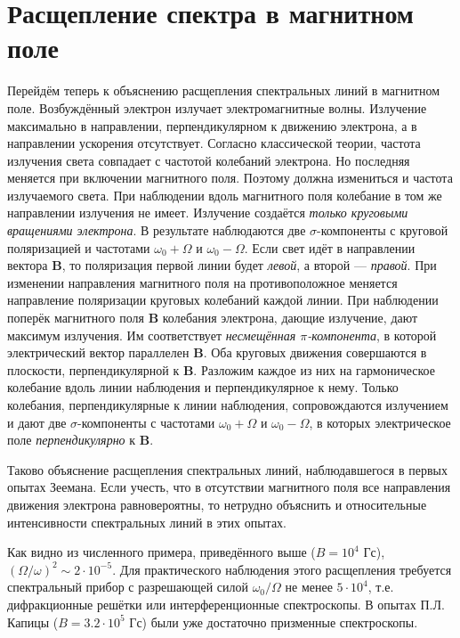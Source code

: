 \documentclass[12pt]{article}
\begin{document}
  \section{Расщепление спектра в магнитном поле}
  Перейдём теперь к объяснению расщепления спектральных линий в магнитном поле. Возбуждённый электрон излучает электромагнитные волны. Излучение максимально в направлении, перпендикулярном к движению электрона, а в направлении ускорения отсутствует. Согласно классической теории, частота излучения света совпадает с частотой колебаний электрона. Но последняя меняется при включении магнитного поля. Поэтому должна измениться и частота излучаемого света. При наблюдении вдоль магнитного поля колебание в том же направлении излучения не имеет. Излучение создаётся \textit{только круговыми вращениями электрона}. В результате наблюдаются две $\sigma$-компоненты с круговой поляризацией и частотами $\omega_0 + \Omega$ и $\omega_0 - \Omega$. Если свет идёт в направлении вектора $\mathbf{B}$, то поляризация первой линии будет \textit{левой}, а второй — \textit{правой}. При изменении направления магнитного поля на противоположное меняется направление поляризации круговых колебаний каждой линии. При наблюдении поперёк магнитного поля $\mathbf{B}$ колебания электрона, дающие излучение, дают максимум излучения. Им соответствует \textit{несмещённая $\pi$-компонента}, в которой электрический вектор параллелен $\mathbf{B}$. Оба круговых движения совершаются в плоскости, перпендикулярной к $\mathbf{B}$. Разложим каждое из них на гармоническое колебание вдоль линии наблюдения и перпендикулярное к нему. Только колебания, перпендикулярные к линии наблюдения, сопровождаются излучением и дают две $\sigma$-компоненты с частотами $\omega_0 + \Omega$ и $\omega_0 - \Omega$, в которых электрическое поле \textit{перпендикулярно} к $\mathbf{B}$.

  Таково объяснение расщепления спектральных линий, наблюдавшегося в первых опытах Зеемана. Если учесть, что в отсутствии магнитного поля все направления движения электрона равновероятны, то нетрудно объяснить и относительные интенсивности спектральных линий в этих опытах.

  Как видно из численного примера, приведённого выше ($B = 10^4$ Гс), $(\Omega/\omega)^2 \sim 2 \cdot 10^{-5}$. Для практического наблюдения этого расщепления требуется спектральный прибор с разрешающей силой $\omega_0 / \Omega$ не менее $5 \cdot 10^4$, т.е. дифракционные решётки или интерференционные спектроскопы. В опытах П.Л. Капицы ($B = 3.2 \cdot 10^5$ Гс) были уже достаточно призменные спектроскопы.
\end{document}

